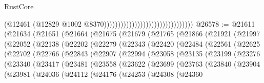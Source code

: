 \begin{lexlean}{RustCore}
\begin{coremodule}
                                                                (@12461
                                                                  (@12829
                                                                    @1002
                                                                    @8370))))))))))))))))))))))))))))))))
@26578 := @21611
    (@21634
      (@21651
        (@21664
          (@21675
            (@21679
              (@21765
                (@21866
                  (@21921
                    (@21997
                      (@22052
                        (@22138
                          (@22202
                            (@22279
                              (@22343
                                (@22420
                                  (@22484
                                    (@22561
                                      (@22625
                                        (@22702
                                          (@22766
                                            (@22843
                                              (@22907
                                                (@22994
                                                  (@23058
                                                    (@23135
                                                      (@23199
                                                        (@23276
                                                          (@23340
                                                            (@23417
                                                              (@23481
                                                                (@23558
                                                                  (@23622
                                                                    (@23699
                                                                      (@23763
                                                                        (@23840
                                                                          (@23904
                                                                            (@23981
                                                                              (@24036
                                                                                (@24112
                                                                                  (@24176
                                                                                    (@24253
                                                                                      (@24308
                                                                                        (@24360

\end{coremodule}
\end{lexlean}

